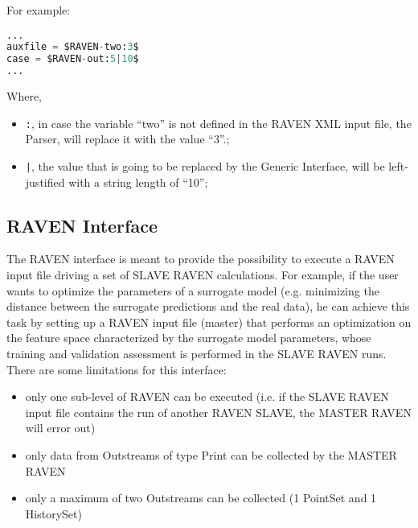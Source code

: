 For example:
\begin{lstlisting}[language=python]
...
auxfile = $RAVEN-two:3$
case = $RAVEN-out:5|10$
...
\end{lstlisting}
Where,
\begin{itemize}
  \item  \texttt{:}, in case the variable ``two'' is not defined in the RAVEN XML input file, the Parser, will replace it with the value ``3''.;
  \item  \texttt{|}, the value that is going to be replaced by the Generic Interface, will be left- justified with a string length of ``10'';
\end{itemize}

\subsection{RAVEN Interface}
\label{subsec:RAVENInterface}
The RAVEN interface is meant to provide the possibility to execute a RAVEN input file
driving a set of SLAVE RAVEN calculations. For example, if the user wants to optimize the parameters
of a surrogate model (e.g. minimizing the distance between the surrogate predictions and the real data), he
can achieve this task by setting up  a RAVEN input file (master) that performs an optimization on the feature
space characterized by the surrogate model parameters, whose training and validation assessment  is performed in the SLAVE
RAVEN runs.
\\ There are some limitations for this interface:
\begin{itemize}
\item only one  sub-level of RAVEN can be executed (i.e. if the SLAVE RAVEN input file contains the run of another RAVEN SLAVE, the MASTER RAVEN will error out)
\item only data from Outstreams of type Print can be collected by the MASTER RAVEN
\item only a maximum of two Outstreams can be collected (1 PointSet and 1 HistorySet)
\end{itemize}


